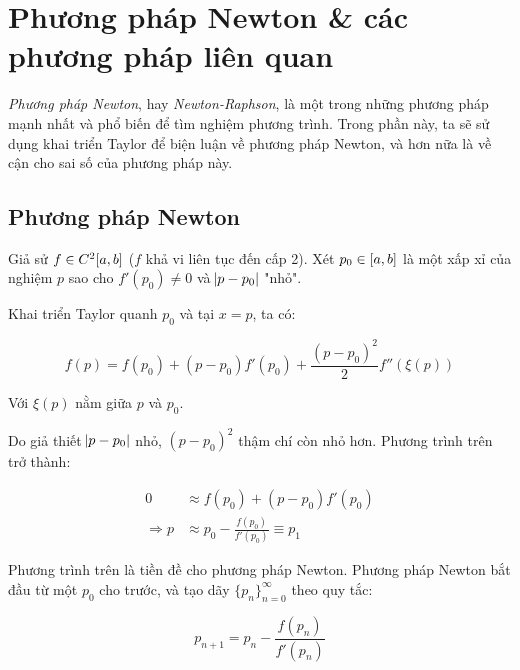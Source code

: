 \documentclass[../../Lectures.tex]{subfiles}
\begin{document}

\section{Phương pháp Newton \& các phương pháp liên quan}

\emph{Phương pháp Newton}, hay \emph{Newton-Raphson}, là một trong những phương
pháp mạnh nhất và phổ biến để tìm nghiệm phương trình. Trong phần này, ta sẽ sử
dụng khai triển Taylor để biện luận về phương pháp Newton, và hơn nữa là về cận
cho sai số của phương pháp này.

\subsection{Phương pháp Newton}\label{sec:newton_method}

Giả sử \(f \in C^2\interval{a}{b}\) (\(f\) khả vi liên tục đến cấp 2). Xét \(p_0
\in \interval{a}{b}\) là một xấp xỉ của nghiệm \(p\) sao cho \(f'(p_0) \neq 0\)
và \(\abs{p - p_0}\) "nhỏ".

Khai triển Taylor quanh \(p_0\) và tại \(x = p\), ta có:

\[f(p) = f(p_0) + (p - p_0) f'(p_0) + \frac{(p - p_0)^2}{2} f''(\xi(p))\]

Với \(\xi(p)\) nằm giữa \(p\) và \(p_0\).

Do giả thiết \(\abs{p - p_0}\) nhỏ, \((p - p_0)^2\) thậm chí còn nhỏ hơn. Phương
trình trên trở thành:

\[\begin{aligned}
                0 & \approx f(p_0) + (p - p_0) f'(p_0) \\
    \Rightarrow	p & \approx p_0 - \frac{f(p_0)}{f'(p_0)} \equiv p_1
\end{aligned}\]

Phương trình trên là tiền đề cho phương pháp Newton. Phương pháp Newton bắt đầu
từ một \(p_0\) cho trước, và tạo dãy \(\{p_n\}_{n = 0}^\infty\) theo quy tắc:

\begin{equation}\label{eq:newton_sequence_function}
    p_{n + 1} = p_n - \frac{f(p_n)}{f'(p_n)}
\end{equation}

\end{document}

